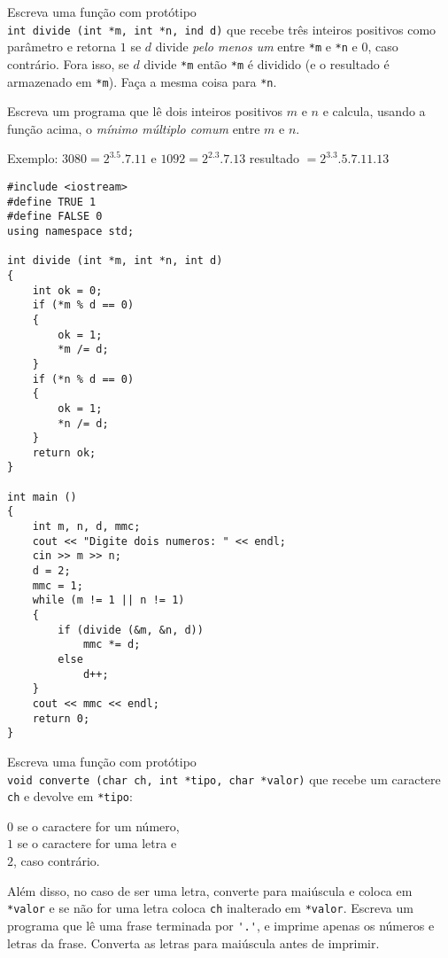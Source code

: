 \documentclass[a4paper]{memoir}
\begin{document}
\begin{prob}\label{prob214.cpp}
Escreva uma função com protótipo\\
 \verb|int divide (int *m, int *n, ind d)| que recebe três inteiros positivos como parâmetro e retorna $1$ se $d$ divide \emph{pelo menos um} entre \verb|*m| e \verb|*n| e $0$, caso contrário. Fora isso, se $d$ divide \verb|*m| então \verb|*m| é dividido (e o resultado é armazenado em \verb|*m|). Faça a mesma coisa para \verb|*n|.

Escreva um programa que lê dois inteiros positivos $m$ e $n$ e calcula, usando a função acima, o \emph{mínimo múltiplo comum} entre $m$ e $n$.

Exemplo: $3080 = 2^3.5.7.11$ e $1092 = 2^2.3.7.13$ resultado $= 2^3.3.5.7.11.13$
\end{prob}

\begin{sol}
\begin{lstlisting}
#include <iostream>
#define TRUE 1
#define FALSE 0
using namespace std;

int divide (int *m, int *n, int d)
{
    int ok = 0;
    if (*m % d == 0)
    {
        ok = 1;
        *m /= d;
    }
    if (*n % d == 0)
    {
        ok = 1;
        *n /= d;
    }
    return ok;
}

int main ()
{
    int m, n, d, mmc;
    cout << "Digite dois numeros: " << endl;
    cin >> m >> n;
    d = 2;
    mmc = 1;
    while (m != 1 || n != 1)
    {
        if (divide (&m, &n, d))
            mmc *= d;
        else
            d++;
    }
    cout << mmc << endl;
    return 0;
}
\end{lstlisting}
\end{sol}

\newpage

\begin{prob}\label{prob215.cpp}
Escreva uma função com protótipo\\
\verb|void converte (char ch, int *tipo, char *valor)| que recebe um caractere \verb|ch| e devolve em \verb|*tipo|:

$0$ se o caractere for um número,\\
$1$ se o caractere for uma letra e\\
$2$, caso contrário.

Além disso, no caso de ser uma letra, converte para maiúscula e coloca em \verb|*valor| e se não for uma letra coloca \verb|ch| inalterado em \verb|*valor|. Escreva um programa que lê uma frase terminada por \verb|'.'|, e imprime apenas os números e letras da frase. Converta as letras para maiúscula antes de imprimir.
\end{prob}
\end{document}
